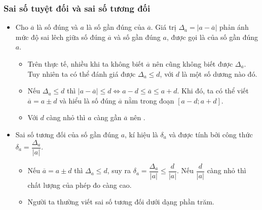 \subsubsection{Sai số tuyệt đối và sai số tương đối}
\begin{itemize}
	\item [\iconMT]  Cho $\overline{a}$ là số đúng và $a$ là số gần đúng của $\overline{a}$. Giá trị $\Delta_a=\big|a-\overline{a}\big|$ phản ánh mức độ sai lêch giữa số đúng $\overline{a}$ và số gần đúng $a$, được gọi là  của số gần đúng $a$.
	\begin{boxkn}
		\begin{itemize}
			\item Trên thực tế, nhiều khi ta không biết $\overline{a}$ nên cũng không biết được $\Delta_a$. Tuy nhiên ta có thể đánh giá được $\Delta_a \le d$, với $d$ là một số dương nào đó.
			\item  Nếu $\Delta_a \le d$ thì $\big|a-\overline{a}\big|\le d \Leftrightarrow a-d \le \overline{a} \le a+d$. Khi đó, ta có thể viết $\overline{a}=a \pm d$ và hiểu là số đúng $\overline{a}$ nằm trong đoạn $\left[a-d;a+d \right]$. 
			\item Với $d$ càng nhỏ thì $a$ càng gần $\overline{a}$ nên .
		\end{itemize}
	\end{boxkn}
	\item [\iconMT]   Sai số tương đối của số gần đúng $a$, kí hiệu là $\delta_{a}$ và được tính bởi công thức $\delta_{a}=\dfrac{\Delta_a}{|a|}$.
	\begin{boxkn}
		\begin{itemize}
			\item  Nếu $\overline{a}=a \pm d$ thì $\Delta_a \le d$, suy ra $\delta_{a}=\dfrac{\Delta_a}{|a|} \le \dfrac{d}{|a|}$. Nếu $\dfrac{d}{|a|}$ càng nhỏ thì chất lượng của phép đo càng cao.
			\item Người ta thường viết sai số tương đối dưới dạng phần trăm.
		\end{itemize}
	\end{boxkn}
\end{itemize}
